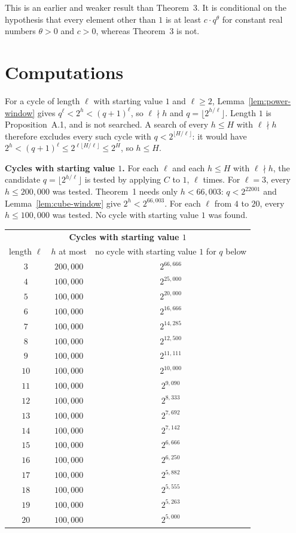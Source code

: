 \documentclass[11pt]{article}
\newcommand{\topic}[1]{\par\noindent\textbf{#1}}
\begin{document}
This is an earlier and weaker result than Theorem~3. It is conditional on the hypothesis that every element other than $1$ is at least $c \cdot q^\theta$ for constant real numbers $\theta > 0$ and $c > 0$, whereas Theorem~3 is not.

\section{Computations}
\label{app:computations}

For a cycle of length $\ell$ with starting value $1$ and $\ell \ge 2$, Lemma~\ref{lem:power-window} gives $q^\ell < 2^h < (q+1)^\ell$, so $\ell \nmid h$ and $q = \lfloor 2^{h/\ell}\rfloor$.
Length $1$ is Proposition~A.1, and is not searched.
A search of every $h \le H$ with $\ell \nmid h$ therefore excludes every such cycle with $q < 2^{\lfloor H/\ell \rfloor}$: it would have $2^h < (q+1)^\ell \le 2^{\ell \lfloor H/\ell \rfloor} \le 2^H$, so $h \le H$.

\topic{Cycles with starting value $1$.}
For each $\ell$ and each $h \le H$ with $\ell \nmid h$, the candidate $q = \lfloor 2^{h/\ell}\rfloor$ is tested by applying $C$ to $1$, $\ell$ times.
For $\ell = 3$, every $h \le 200{,}000$ was tested.
Theorem~1 needs only $h < 66{,}003$: $q < 2^{22001}$ and Lemma~\ref{lem:cube-window} give $2^h < 2^{66{,}003}$.
For each $\ell$ from $4$ to $20$, every $h \le 100{,}000$ was tested.
No cycle with starting value $1$ was found.
\begin{center}
\begin{tabular}{ccc}
\multicolumn{3}{c}{\textbf{Cycles with starting value $1$}} \\[0.4em]
length $\ell$ & $h$ at most & no cycle with starting value $1$ for $q$ below \\
$3$ & $200{,}000$ & $2^{66{,}666}$ \\
$4$ & $100{,}000$ & $2^{25{,}000}$ \\
$5$ & $100{,}000$ & $2^{20{,}000}$ \\
$6$ & $100{,}000$ & $2^{16{,}666}$ \\
$7$ & $100{,}000$ & $2^{14{,}285}$ \\
$8$ & $100{,}000$ & $2^{12{,}500}$ \\
$9$ & $100{,}000$ & $2^{11{,}111}$ \\
$10$ & $100{,}000$ & $2^{10{,}000}$ \\
$11$ & $100{,}000$ & $2^{9{,}090}$ \\
$12$ & $100{,}000$ & $2^{8{,}333}$ \\
$13$ & $100{,}000$ & $2^{7{,}692}$ \\
$14$ & $100{,}000$ & $2^{7{,}142}$ \\
$15$ & $100{,}000$ & $2^{6{,}666}$ \\
$16$ & $100{,}000$ & $2^{6{,}250}$ \\
$17$ & $100{,}000$ & $2^{5{,}882}$ \\
$18$ & $100{,}000$ & $2^{5{,}555}$ \\
$19$ & $100{,}000$ & $2^{5{,}263}$ \\
$20$ & $100{,}000$ & $2^{5{,}000}$ \\
\end{tabular}
\end{center}
\end{document}

